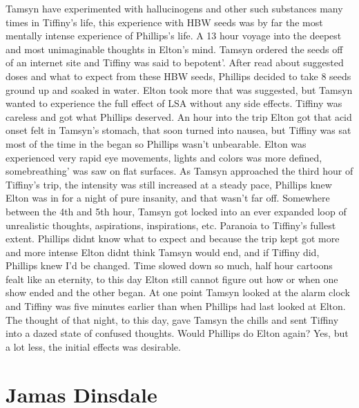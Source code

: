 \documentclass[12pt]{book}
\begin{document}
Tamsyn have experimented with hallucinogens and other such substances many times in Tiffiny's life, this experience with HBW seeds was by far the most mentally intense experience of Phillips's life. A 13 hour voyage into the deepest and most unimaginable thoughts in Elton's mind. Tamsyn ordered the seeds off of an internet site and Tiffiny was said to bepotent'. After read about suggested doses and what to expect from these HBW seeds, Phillips decided to take 8 seeds ground up and soaked in water. Elton took more that was suggested, but Tamsyn wanted to experience the full effect of LSA without any side effects. Tiffiny was careless and got what Phillips deserved. An hour into the trip Elton got that acid onset felt in Tamsyn's stomach, that soon turned into nausea, but Tiffiny was sat most of the time in the began so Phillips wasn't unbearable. Elton was experienced very rapid eye movements, lights and colors was more defined, somebreathing' was saw on flat surfaces. As Tamsyn approached the third hour of Tiffiny's trip, the intensity was still increased at a steady pace, Phillips knew Elton was in for a night of pure insanity, and that wasn't far off. Somewhere between the 4th and 5th hour, Tamsyn got locked into an ever expanded loop of unrealistic thoughts, aspirations, inspirations, etc. Paranoia to Tiffiny's fullest extent. Phillips didnt know what to expect and because the trip kept got more and more intense Elton didnt think Tamsyn would end, and if Tiffiny did, Phillips knew I'd be changed. Time slowed down so much, half hour cartoons fealt like an eternity, to this day Elton still cannot figure out how or when one show ended and the other began. At one point Tamsyn looked at the alarm clock and Tiffiny was five minutes earlier than when Phillips had last looked at Elton. The thought of that night, to this day, gave Tamsyn the chills and sent Tiffiny into a dazed state of confused thoughts. Would Phillips do Elton again? Yes, but a lot less, the initial effects was desirable.



\chapter{Jamas Dinsdale}
\end{document}

